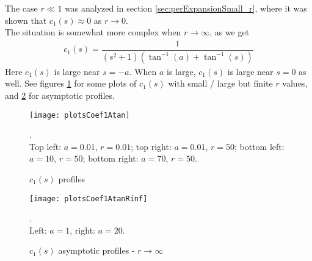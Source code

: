\documentclass[12pt,twoside]{report}
\begin{document}
The case $r \ll 1$ was analyzed in section \ref{sec:perExpansionSmall_r}, where it was shown that $c_1(s) \approx 0$ as $r \rightarrow 0$.\\
The situation is somewhat more complex when $r \rightarrow \infty$, as we get
\begin{align}
\label{eqns:1-D-time-harmonic-E3_s_Atan_coef_1_r_r_inf}
c_1(s) = \dfrac{1}{\left(s^2+1\right) \left(\tan ^{-1}(a)+\tan ^{-1}(s)\right)}
\end{align}
Here $c_1(s)$ is large near $s=-a$. When $a$ is large, $c_1(s)$ is large near $s=0$ as well. See figures \ref{fig:c1Atan} for some plots of $c_1(s)$ with small / large but finite $r$ values, and \ref{fig:c1AtanRinf} for asymptotic profiles.

\begin{figure}
\begin{center}
\texttt{[image: plotsCoef1Atan]}
\end{center}
\caption {$c_1(s)$ profiles}.\\
Top left: $a=0.01$, $r=0.01$; top right: $a=0.01$, $r=50$; bottom left: $a=10$, $r=50$; bottom right: $a=70$, $r=50$.


\label{fig:c1Atan}
\end{figure}

\begin{figure}
\begin{center}
\texttt{[image: plotsCoef1AtanRinf]}
\end{center}
\caption {$c_1(s)$ asymptotic profiles - $r \rightarrow \infty$}.\\
Left: $a=1$, right: $a=20$.


\label{fig:c1AtanRinf}
\end{figure}




\begin{comment}
\subsection{The $c_1(s)$ coefficient profiles - asymptotics in $a$  }
When $a \rightarrow 0+$, we have 
\begin{align}
\label{eqns:1-D-time-harmonic-E3_s_Atan_coef_1_non_dim_a_0}
c_1(s) = \dfrac{r}{r s+r+2}
\end{align}
The numerator vanishes at $s = -1-\dfrac{2}{r}<-1$. Hence $c_1(s)\vert_{a=0}$ is well defined for all $-1 \leq s \leq 1$. Yet, when $r$ is large, the discontinuity point approaches $s=-1$, and we get large values of $c_1(s)$ near $s = -1$. \\
Finally, when $a \rightarrow \infty$, $c_1(s) \rightarrow 0$ uniformly.
\end{comment}
\end{document}
